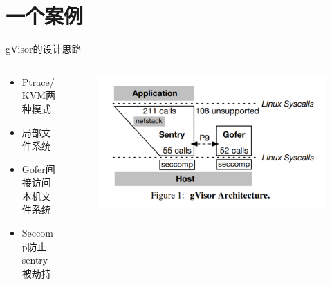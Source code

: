 \documentclass[UTF8,aspectratio=169,fontset=macnew,xcolor=table]{ctexbeamer}
\begin{document}
\section{一个案例}

\begin{frame}{gVisor的设计思路}
    \begin{columns}
        \begin{column}{0.5\textwidth}
            \begin{itemize}
                \item Ptrace/KVM两种模式
                \item 局部文件系统
                \item Gofer间接访问本机文件系统
                \item Seccomp防止sentry被劫持
            \end{itemize}
        \end{column}

        \begin{column}{0.5\textwidth}
            \begin{figure}[H]
                \centering
                \includegraphics[width=\columnwidth]{pic1.png}
            \end{figure}
        \end{column}
    \end{columns}
\end{frame}
\end{document}
